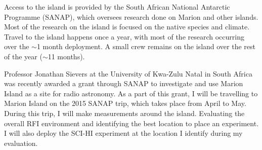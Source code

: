 Access to the island is provided by the South African National Antarctic Programme (SANAP), which oversees research done on Marion and other islands. Most of the research on the island is focused on the native species and climate. Travel to the island happens once a year, with most of the research occurring over the $\sim$1 month deployment. A small crew remains on the island over the rest of the year ($\sim$11 months). 

Professor Jonathan Sievers at the University of Kwa-Zulu Natal in South Africa was recently awarded a grant through SANAP to investigate and use Marion Island as a site for radio astronomy. As a part of this grant, I will be travelling to Marion Island on the 2015 SANAP trip, which takes place from April to May. During this trip, I will make measurements around the island. Evaluating the overall RFI environment and identifying the best location to place an experiment. I will also deploy the SCI-HI experiment at the location I identify during my evaluation. 

